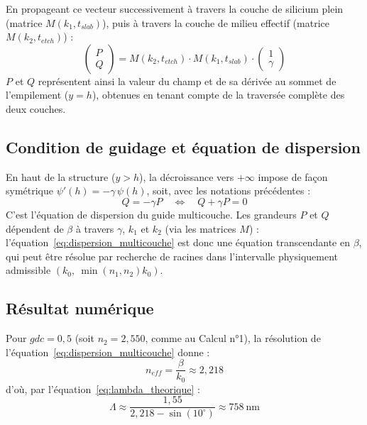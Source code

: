 \documentclass[a4paper,11pt]{report}
\begin{document}
En propageant ce vecteur successivement à travers la couche de silicium plein (matrice $M(k_1,t_{slab})$), puis à travers la couche de milieu effectif (matrice $M(k_2,t_{etch})$) :
\begin{equation}
\begin{pmatrix}P\\Q\end{pmatrix} = M(k_2,t_{etch})\cdot M(k_1,t_{slab})\cdot\begin{pmatrix}1\\\gamma\end{pmatrix}
\label{eq:propagation}
\end{equation}
$P$ et $Q$ représentent ainsi la valeur du champ et de sa dérivée au sommet de l'empilement ($y=h$), obtenues en tenant compte de la traversée complète des deux couches.

\subsection*{Condition de guidage et équation de dispersion}

En haut de la structure ($y>h$), la décroissance vers $+\infty$ impose de façon symétrique $\psi'(h)=-\gamma\,\psi(h)$, soit, avec les notations précédentes :
\begin{equation}
Q = -\gamma P \quad\Longleftrightarrow\quad Q+\gamma P = 0
\label{eq:dispersion_multicouche}
\end{equation}
C'est l'équation de dispersion du guide multicouche. Les grandeurs $P$ et $Q$ dépendent de $\beta$ à travers $\gamma$, $k_1$ et $k_2$ (via les matrices $M$) : l'équation~\eqref{eq:dispersion_multicouche} est donc une équation transcendante en $\beta$, qui peut être résolue par recherche de racines dans l'intervalle physiquement admissible $\left(k_0,\ \min(n_1,n_2)k_0\right)$.

\subsection*{Résultat numérique}

Pour $gdc=0{,}5$ (soit $n_2=2{,}550$, comme au Calcul n°1), la résolution de l'équation~\eqref{eq:dispersion_multicouche} donne :
\begin{equation}
n_{eff} = \frac{\beta}{k_0} \approx 2{,}218
\end{equation}
d'où, par l'équation~\eqref{eq:lambda_theorique} :
\begin{equation}
\Lambda \approx \frac{1{,}55}{2{,}218-\sin(10^\circ)} \approx 758~\text{nm}
\end{equation}
\end{document}
